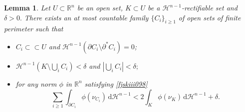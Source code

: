 \documentclass[reqno]{amsart}
\numberwithin{equation}{section}
\theoremstyle{plain}
\newtheorem{lemma}[theorem]{Lemma}
\theoremstyle{definition}
\newcommand{\R}{\mathbb{R}}
\newcommand{\cH}{\mathcal{H}}
\newcommand{\p}{\partial}
\renewcommand{\d}{\mathrm{d}}
\newcommand{\strictlyincluded}{\subset\subset}
\begin{document}
\begin{lemma}\label{lem:opening_cracks}
Let $U\subset \R^n$ be an open set, $K\subset U$ be a $\cH^{n-1}$-rectifiable set and $\delta>0.$ There exists an at  most countable family $\{C_i\}_{i\ge1}$ of open sets of finite perimeter such that 
%
\begin{itemize}[left=15pt]
\item[\rm(i)] $C_i\strictlyincluded U$ and $\cH^{n-1}(\p C_i\setminus \p^* C_i)=0$; 

\item[\rm(ii)]  $\cH^{n-1}(K \setminus \bigcup_i C_i) < \delta $ and $|\bigcup_i C_i|< \delta;$ 

\item[\rm(iii)] for any norm $\phi$ in $\R^n$ satisfying \eqref{fjskiii098}
$$
\sum\limits_{i\ge1} \int_{\p C_i} \phi(\nu_{C_i})\,\d\cH^{n-1} < 2\int_K \phi(\nu_{K}^{})\,\d\cH^{n-1} + \delta.
$$
\end{itemize}
%
\end{lemma}
\end{document}
